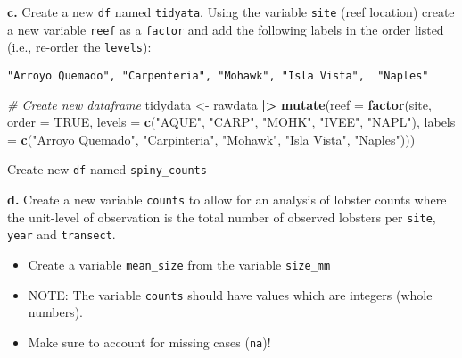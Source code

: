 \documentclass[
]{article}
\newenvironment{Shaded}{\begin{snugshade}}{\end{snugshade}}
\newcommand{\AttributeTok}[1]{\textcolor[rgb]{0.13,0.29,0.53}{#1}}
\newcommand{\CommentTok}[1]{\textcolor[rgb]{0.56,0.35,0.01}{\textit{#1}}}
\newcommand{\ConstantTok}[1]{\textcolor[rgb]{0.56,0.35,0.01}{#1}}
\newcommand{\FunctionTok}[1]{\textcolor[rgb]{0.13,0.29,0.53}{\textbf{#1}}}
\newcommand{\NormalTok}[1]{#1}
\newcommand{\OtherTok}[1]{\textcolor[rgb]{0.56,0.35,0.01}{#1}}
\newcommand{\SpecialCharTok}[1]{\textcolor[rgb]{0.81,0.36,0.00}{\textbf{#1}}}
\newcommand{\StringTok}[1]{\textcolor[rgb]{0.31,0.60,0.02}{#1}}
\providecommand{\tightlist}{%
  \setlength{\itemsep}{0pt}\setlength{\parskip}{0pt}}
\begin{document}
\textbf{c.} Create a new \texttt{df} named \texttt{tidyata}. Using the
variable \texttt{site} (reef location) create a new variable
\texttt{reef} as a \texttt{factor} and add the following labels in the
order listed (i.e., re-order the \texttt{levels}):

\begin{verbatim}
"Arroyo Quemado", "Carpenteria", "Mohawk", "Isla Vista",  "Naples"
\end{verbatim}

\begin{Shaded}
\begin{Highlighting}[]
\CommentTok{\# Create new dataframe }
\NormalTok{tidydata }\OtherTok{\textless{}{-}}\NormalTok{ rawdata }\SpecialCharTok{|\textgreater{}}
    \FunctionTok{mutate}\NormalTok{(}\AttributeTok{reef =} \FunctionTok{factor}\NormalTok{(site, }\AttributeTok{order =} \ConstantTok{TRUE}\NormalTok{,}
                         \AttributeTok{levels =} \FunctionTok{c}\NormalTok{(}\StringTok{"AQUE"}\NormalTok{,}
                                    \StringTok{"CARP"}\NormalTok{,}
                                    \StringTok{"MOHK"}\NormalTok{,}
                                    \StringTok{"IVEE"}\NormalTok{,}
                                    \StringTok{"NAPL"}\NormalTok{),}
                         \AttributeTok{labels =} \FunctionTok{c}\NormalTok{(}\StringTok{"Arroyo Quemado"}\NormalTok{,}
                                    \StringTok{"Carpinteria"}\NormalTok{,}
                                    \StringTok{"Mohawk"}\NormalTok{,}
                                    \StringTok{"Isla Vista"}\NormalTok{,}
                                    \StringTok{"Naples"}\NormalTok{)))}
\end{Highlighting}
\end{Shaded}

Create new \texttt{df} named \texttt{spiny\_counts}

\textbf{d.} Create a new variable \texttt{counts} to allow for an
analysis of lobster counts where the unit-level of observation is the
total number of observed lobsters per \texttt{site}, \texttt{year} and
\texttt{transect}.

\begin{itemize}
\tightlist
\item
  Create a variable \texttt{mean\_size} from the variable
  \texttt{size\_mm}
\item
  NOTE: The variable \texttt{counts} should have values which are
  integers (whole numbers).
\item
  Make sure to account for missing cases (\texttt{na})!
\end{itemize}
\end{document}
